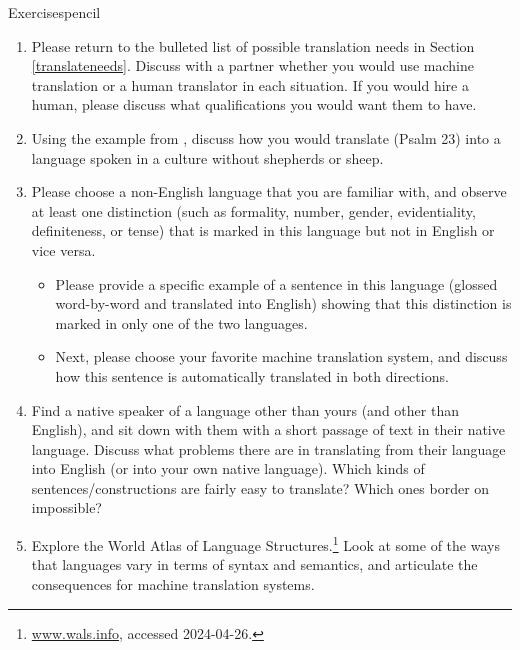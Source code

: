 \begin{tblsfilledsymbol}{Exercises}{pencil}
    
\begin{enumerate}

\item  Please return to the bulleted list of possible translation needs in Section \ref{translateneeds}.  Discuss with a partner whether you would use machine translation or a human translator in each situation.  If you would hire a human, please discuss what qualifications you would want them to have.


\item  Using the example from \citet{Jurafsky.Martin-09}, discuss how you would translate  (Psalm 23) into a language spoken in a culture without shepherds or sheep.


\item Please choose a non-English language that you are familiar with, and observe at least one distinction (such as formality, number, gender, evidentiality, definiteness, or tense) that is marked in this language but not in English or vice versa.  

\begin{itemize}
    \item Please provide a specific example of a sentence in this language (glossed word-by-word and translated into English) showing that this distinction is marked in only one of the two languages.
    \item Next, please choose your favorite machine translation system, and discuss how this sentence is automatically translated in both directions.

\end{itemize}

\item Find a native speaker of a language other than yours (and other
	 than English), and sit down with them with a short passage of text
	 in their native language.  Discuss what problems there are in
	 translating from their language into English (or into your own
	 native language).  Which kinds of sentences/constructions are fairly
	 easy to translate?  Which ones border on impossible?


\item   Explore the World Atlas of Language Structures.\footnote{\url{www.wals.info}, accessed 2024-04-26.} Look at some of the ways that languages vary in terms of syntax and semantics, and articulate the consequences for machine translation systems.


\end{enumerate}
\end{tblsfilledsymbol}
